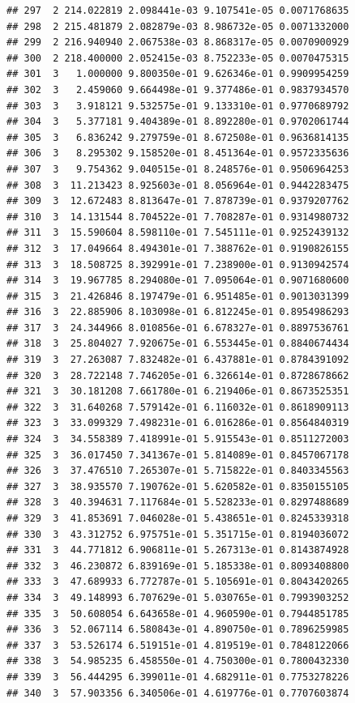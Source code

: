 \documentclass[article]{jss}\usepackage[]{graphicx}\usepackage[]{xcolor}
\makeatletter
\newenvironment{kframe}{%
 \def\at@end@of@kframe{}%
 \ifinner\ifhmode%
  \def\at@end@of@kframe{\end{minipage}}%
  \begin{minipage}{\columnwidth}%
 \fi\fi%
 \def\FrameCommand##1{\hskip\@totalleftmargin \hskip-\fboxsep
 \colorbox{shadecolor}{##1}\hskip-\fboxsep
     \hskip-\linewidth \hskip-\@totalleftmargin \hskip\columnwidth}%
 \MakeFramed {\advance\hsize-\width
   \@totalleftmargin\z@ \linewidth\hsize
   \@setminipage}}%
 {\par\unskip\endMakeFramed%
 \at@end@of@kframe}
\newenvironment{knitrout}{}{} %
\makeatother
\begin{document}
\begin{knitrout}
\begin{kframe}
\begin{verbatim}
## 297  2 214.022819 2.098441e-03 9.107541e-05 0.0071768635
## 298  2 215.481879 2.082879e-03 8.986732e-05 0.0071332000
## 299  2 216.940940 2.067538e-03 8.868317e-05 0.0070900929
## 300  2 218.400000 2.052415e-03 8.752233e-05 0.0070475315
## 301  3   1.000000 9.800350e-01 9.626346e-01 0.9909954259
## 302  3   2.459060 9.664498e-01 9.377486e-01 0.9837934570
## 303  3   3.918121 9.532575e-01 9.133310e-01 0.9770689792
## 304  3   5.377181 9.404389e-01 8.892280e-01 0.9702061744
## 305  3   6.836242 9.279759e-01 8.672508e-01 0.9636814135
## 306  3   8.295302 9.158520e-01 8.451364e-01 0.9572335636
## 307  3   9.754362 9.040515e-01 8.248576e-01 0.9506964253
## 308  3  11.213423 8.925603e-01 8.056964e-01 0.9442283475
## 309  3  12.672483 8.813647e-01 7.878739e-01 0.9379207762
## 310  3  14.131544 8.704522e-01 7.708287e-01 0.9314980732
## 311  3  15.590604 8.598110e-01 7.545111e-01 0.9252439132
## 312  3  17.049664 8.494301e-01 7.388762e-01 0.9190826155
## 313  3  18.508725 8.392991e-01 7.238900e-01 0.9130942574
## 314  3  19.967785 8.294080e-01 7.095064e-01 0.9071680600
## 315  3  21.426846 8.197479e-01 6.951485e-01 0.9013031399
## 316  3  22.885906 8.103098e-01 6.812245e-01 0.8954986293
## 317  3  24.344966 8.010856e-01 6.678327e-01 0.8897536761
## 318  3  25.804027 7.920675e-01 6.553445e-01 0.8840674434
## 319  3  27.263087 7.832482e-01 6.437881e-01 0.8784391092
## 320  3  28.722148 7.746205e-01 6.326614e-01 0.8728678662
## 321  3  30.181208 7.661780e-01 6.219406e-01 0.8673525351
## 322  3  31.640268 7.579142e-01 6.116032e-01 0.8618909113
## 323  3  33.099329 7.498231e-01 6.016286e-01 0.8564840319
## 324  3  34.558389 7.418991e-01 5.915543e-01 0.8511272003
## 325  3  36.017450 7.341367e-01 5.814089e-01 0.8457067178
## 326  3  37.476510 7.265307e-01 5.715822e-01 0.8403345563
## 327  3  38.935570 7.190762e-01 5.620582e-01 0.8350155105
## 328  3  40.394631 7.117684e-01 5.528233e-01 0.8297488689
## 329  3  41.853691 7.046028e-01 5.438651e-01 0.8245339318
## 330  3  43.312752 6.975751e-01 5.351715e-01 0.8194036072
## 331  3  44.771812 6.906811e-01 5.267313e-01 0.8143874928
## 332  3  46.230872 6.839169e-01 5.185338e-01 0.8093408800
## 333  3  47.689933 6.772787e-01 5.105691e-01 0.8043420265
## 334  3  49.148993 6.707629e-01 5.030765e-01 0.7993903252
## 335  3  50.608054 6.643658e-01 4.960590e-01 0.7944851785
## 336  3  52.067114 6.580843e-01 4.890750e-01 0.7896259985
## 337  3  53.526174 6.519151e-01 4.819519e-01 0.7848122066
## 338  3  54.985235 6.458550e-01 4.750300e-01 0.7800432330
## 339  3  56.444295 6.399011e-01 4.682911e-01 0.7753278226
## 340  3  57.903356 6.340506e-01 4.619776e-01 0.7707603874

\end{verbatim}
\end{kframe}
\end{knitrout}
\end{document}
